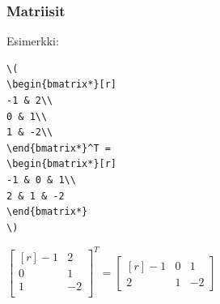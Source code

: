 \documentclass[handout]{beamer}
\theoremstyle{remark}
\newcommand{\vaihto}{\\ \vspace{10pt}}
\begin{document}
\begin{frame}[fragile]
\frametitle{Matriisit}

Esimerkki:\vaihto
\begin{minipage}{5cm}
\begin{scriptsize}
\begin{Verbatim}[frame=single]
\(
\begin{bmatrix*}[r]
-1 & 2\\
0 & 1\\
1 & -2\\
\end{bmatrix*}^T = 
\begin{bmatrix*}[r]
-1 & 0 & 1\\
2 & 1 & -2
\end{bmatrix*}
\)
\end{Verbatim}
\end{scriptsize}
\end{minipage}
\begin{minipage}{5cm}
\(
\begin{bmatrix*}[r]
-1 & 2\\
0 & 1\\
1 & -2\\
\end{bmatrix*}^T = 
\begin{bmatrix*}[r]
-1 & 0 & 1\\
2 & 1 & -2
\end{bmatrix*}
\)
\end{minipage}
\end{frame}
\end{document}
